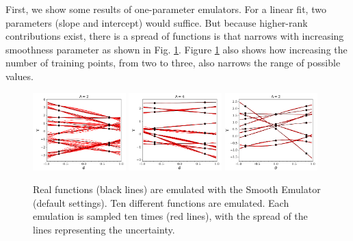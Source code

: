 \documentclass[12pt]{article}
\numberwithin{equation}{section}
\numberwithin{figure}{section}
\begin{document}
First, we show some results of one-parameter emulators. For a linear fit, two parameters (slope and intercept) would suffice. But because higher-rank contributions exist, there is a spread of functions is that narrows with increasing smoothness parameter as shown in Fig. \ref{fig:onedim}. Figure \ref{fig:onedim} also shows how increasing the number of training points, from two to three, also narrows the range of possible values. 
\begin{figure}
\includegraphics[width=0.32\textwidth]{onepar2points/onepartest_Lambda2}\hspace*{0.02\textwidth}
\includegraphics[width=0.32\textwidth]{onepar2points/onepartest_Lambda4}\hspace*{0.02\textwidth}
\includegraphics[width=0.32\textwidth]{onepar3points/onepartest_Lambda2}
\caption{\label{fig:onedim}
Real functions (black lines) are emulated with the Smooth Emulator (default settings). Ten different functions are emulated. Each emulation is sampled ten times (red lines), with the spread of the lines representing the uncertainty.}
\end{figure}
\end{document}
